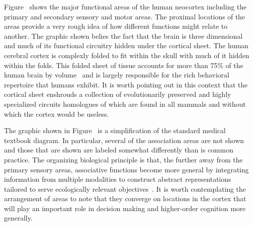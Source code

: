 Figure~{} shows the major functional areas of the human neocortex including the primary and secondary sensory and motor areas. The proximal locations of the areas provide a very rough idea of how different functions might relate to another. The graphic shown belies the fact that the brain is three dimensional and much of its functional circuitry hidden under the cortical sheet. The human cerebral cortex is complexly folded to fit within the skull with much of it hidden within the folds. This folded sheet of tissue accounts for more than 75\% of the human brain by volume~\cite{SwansonTiN-95} and is largely responsible for the rich behavioral repertoire that humans exhibit. It is worth pointing out in this context that the cortical sheet enshrouds a collection of evolutionarily preserved and highly specialized circuits homologues of which are found in all mammals and without which the cortex would be useless.

The graphic shown in Figure~{} is a simplification of the standard medical textbook diagram. In particular, several of the association areas are not shown and those that are shown are labeled somewhat differently than is common practice. The organizing biological principle is that, the further away from the primary sensory areas, associative functions become more general by integrating information from multiple modalities to construct abstract representations tailored to serve ecologically relevant objectives~\cite{Higher_Cortical_Functions_Association}. It is worth contemplating the arrangement of areas to note that they converge on locations in the cortex that will play an important role in decision making and higher-order cognition more generally.


